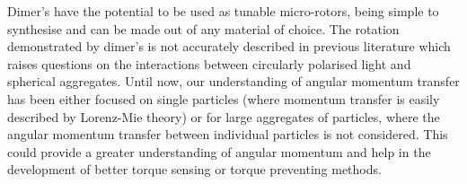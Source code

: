 Dimer's have the potential to be used as tunable micro-rotors, 
being simple to synthesise and can be made out of any material 
of choice. The rotation demonstrated by dimer's is not accurately
described in previous literature which raises questions on the
interactions between circularly polarised light and spherical 
aggregates. Until now, our understanding of angular momentum 
transfer has been either focused on single particles (where 
momentum transfer is easily described by Lorenz-Mie theory) or 
for large aggregates of particles, where the angular momentum 
transfer between individual particles is not considered. This 
could provide a greater understanding of angular momentum and 
help in the development of better torque sensing or torque 
preventing methods.

